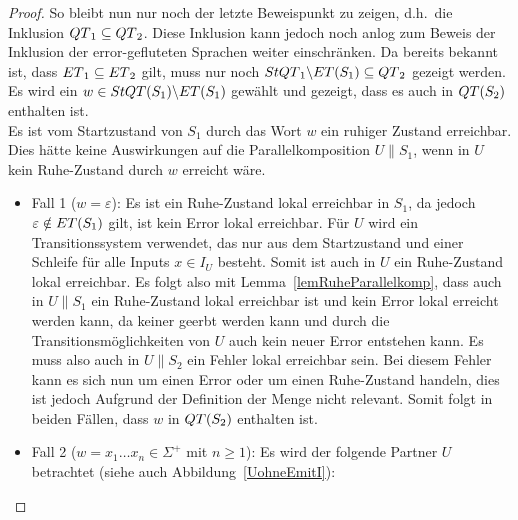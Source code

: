 \begin{proof}
  So bleibt nun nur noch der letzte Beweispunkt zu zeigen, d.h.\ die Inklusion
  $QT{}_1\subseteq QT{}_2$. Diese Inklusion kann jedoch noch anlog zum Beweis
  der Inklusion der error-gefluteten Sprachen weiter einschränken.
  Da bereits bekannt ist, dass $ET{}_1\subseteq ET{}_2$ gilt, muss nur
  noch $StQT{}_1\backslash ET{}(S_1)\subseteq QT{}_2$ gezeigt werden.\\
  Es wird ein $w\in StQT{}(S_1)\backslash ET{}(S_1)$ gewählt und gezeigt, dass
  es auch in $QT{}(S_2)$ enthalten ist.\\
  Es ist vom Startzustand von $S_1$ durch das Wort $w$ ein ruhiger Zustand
  erreichbar. Dies hätte keine Auswirkungen auf die Parallelkomposition
  $U\|S_1$, wenn in $U$ kein Ruhe-Zustand durch $w$ erreicht wäre.
  \begin{itemize}
    \item Fall 1 ($w=\varepsilon$): Es ist ein Ruhe-Zustand lokal erreichbar in
      $S_1$, da jedoch $\varepsilon\notin ET{}(S_1)$ gilt, ist kein Error
      lokal erreichbar. Für $U$ wird ein Transitionssystem verwendet, das nur
      aus dem Startzustand und einer Schleife für alle Inputs $x\in I_U$
      besteht. Somit ist auch in $U$ ein Ruhe-Zustand lokal erreichbar. Es
      folgt also mit Lemma~\ref{lemRuheParallelkomp}, dass auch in $U\|S_1$ ein
      Ruhe-Zustand lokal erreichbar ist und kein Error lokal erreicht werden
      kann, da keiner geerbt werden kann und durch die Transitionsmöglichkeiten
      von $U$ auch kein neuer Error entstehen kann. Es muss also auch in
      $U\|S_2$ ein Fehler lokal erreichbar sein. Bei diesem Fehler kann es sich
      nun um einen Error oder um einen Ruhe-Zustand handeln, dies ist jedoch
      Aufgrund der Definition der Menge \QT{} nicht relevant. Somit folgt in
      beiden Fällen, dass $w$ in $QT{}(S_2)$ enthalten ist.
    \item Fall 2 ($w=x_1\dots x_n\in \Sigma ^+$ mit $n\geq 1$): Es wird der
      folgende Partner $U$ betrachtet (siehe auch Abbildung~\ref{UohneEmitI}):
\end{itemize}
\end{proof}
